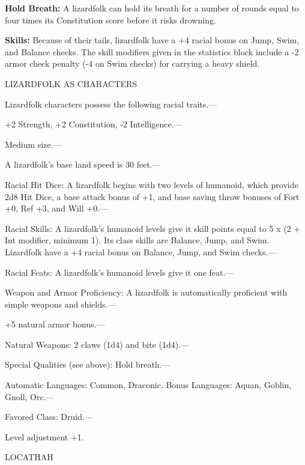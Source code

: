 \documentclass{article}
\begin{document}
\textbf{Hold Breath: }A lizardfolk can hold its breath for a number of rounds equal 
to four times its Constitution score before it risks drowning.

\textbf{Skills:} Because of their tails, lizardfolk have a +4 racial bonus on Jump, 
Swim, and Balance checks. The skill modifiers given in the statistics block include 
a -2 armor check penalty (-4 on Swim checks) for carrying a heavy shield.

LIZARDFOLK AS CHARACTERS

Lizardfolk characters possess the following racial traits.--- 

\parindent=3pt
+2 Strength, +2 Constitution, -2 Intelligence.---

\parindent=0pt
Medium size.---

A lizardfolk's base land speed is 30 feet.---

Racial Hit Dice: A lizardfolk begins with two levels of humanoid, which provide 
2d8 Hit Dice, a base attack bonus of +1, and base saving throw bonuses of Fort 
+0, Ref +3, and Will +0.---

Racial Skills: A lizardfolk's humanoid levels give it skill points equal to 5 x 
$ $(2 + Int modifier, minimum 1). Its class skills are Balance, Jump, and Swim. 
Lizardfolk have a +4 racial bonus on Balance, Jump, and Swim checks.---

Racial Feats: A lizardfolk's humanoid levels give it one feat.---

Weapon and Armor Proficiency: A lizardfolk is automatically proficient with simple 
weapons and shields.--- 

\parindent=3pt
+5 natural armor bonus.---

\parindent=0pt
Natural Weapons: 2 claws (1d4) and bite (1d4).---

Special Qualities (see above): Hold breath.---

Automatic Languages: Common, Draconic. Bonus Languages: Aquan, Goblin, Gnoll, Orc.---

Favored Class: Druid.---

Level adjustment +1.

\vspace{12pt}
{\LARGE{}LOCATHAH}
\end{document}
